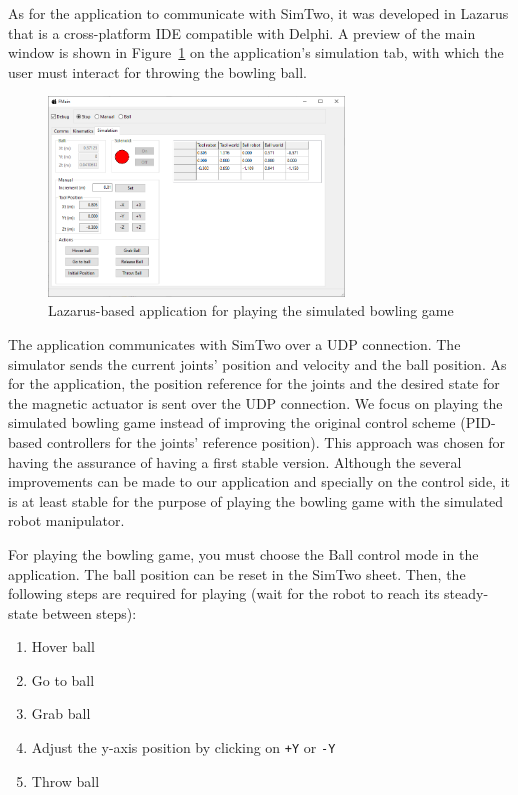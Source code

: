 \documentclass[10pt,a4paper,notitlepage,twocolumn,twoside]{article}
\begin{document}
As for the application to communicate with SimTwo, it was developed in Lazarus that is a cross-platform IDE compatible with Delphi. A preview of the main window is shown in Figure~\ref{fig:app} on the application's simulation tab, with which the user must interact for throwing the bowling ball.

\begin{figure}[!t]
  \centering
  \includegraphics[width=0.7\textwidth]{images/app.png}
  \caption{Lazarus-based application for playing the simulated bowling game}
  \label{fig:app}
\end{figure}

The application communicates with SimTwo over a UDP connection. The simulator sends the current joints' position and velocity and the ball position. As for the application, the position reference for the joints and the desired state for the magnetic actuator is sent over the UDP connection. We focus on playing the simulated bowling game instead of improving the original control scheme (PID-based controllers for the joints' reference position). This approach was chosen for having the assurance of having a first stable version. Although the several improvements can be made to our application and specially on the control side, it is at least stable for the purpose of playing the bowling game with the simulated robot manipulator.

For playing the bowling game, you must choose the Ball control mode in the application. The ball position can be reset in the SimTwo sheet. Then, the following steps are required for playing (wait for the robot to reach its steady-state between steps):

\begin{enumerate}
\item Hover ball
\item Go to ball
\item Grab ball
\item Adjust the y-axis position by clicking on \texttt{+Y} or \texttt{-Y}
\item Throw ball
\end{enumerate}
\end{document}
